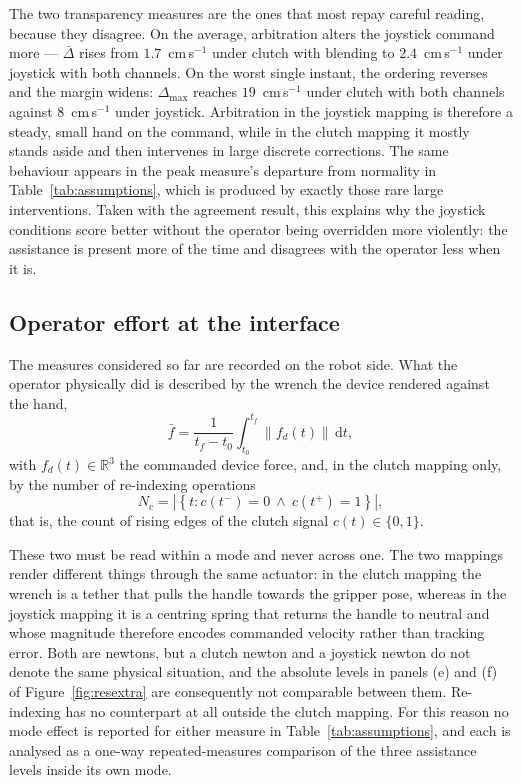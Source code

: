 \documentclass[12pt,a4paper,twoside,openright]{report}
\begin{document}
The two transparency measures are the ones that most repay careful reading, because they disagree. On the average, arbitration alters the joystick command more --- $\bar{\Delta}$ rises from $1.7$~cm\,s$^{-1}$ under clutch with blending to $2.4$~cm\,s$^{-1}$ under joystick with both channels. On the worst single instant, the ordering reverses and the margin widens: $\Delta_{\max}$ reaches $19$~cm\,s$^{-1}$ under clutch with both channels against $8$~cm\,s$^{-1}$ under joystick. Arbitration in the joystick mapping is therefore a steady, small hand on the command, while in the clutch mapping it mostly stands aside and then intervenes in large discrete corrections. The same behaviour appears in the peak measure's departure from normality in Table~\ref{tab:assumptions}, which is produced by exactly those rare large interventions. Taken with the agreement result, this explains why the joystick conditions score better without the operator being overridden more violently: the assistance is present more of the time and disagrees with the operator less when it is.



\subsection{Operator effort at the interface}
\label{sec:reseffort}

The measures considered so far are recorded on the robot side. What the operator physically did is described by the wrench the device rendered against the hand,
\begin{equation}
\bar{f} = \frac{1}{t_f-t_0} \int_{t_0}^{t_f} \lVert f_d(t) \rVert \, \mathrm{d}t,
\label{eq:mf}
\end{equation}
with $f_d(t) \in \mathbb{R}^3$ the commanded device force, and, in the clutch mapping only, by the number of re-indexing operations
\begin{equation}
N_c = \left| \left\{ t : c(t^-) = 0 \ \wedge \ c(t^+) = 1 \right\} \right|,
\label{eq:mNc}
\end{equation}
that is, the count of rising edges of the clutch signal $c(t) \in \{0,1\}$.

These two must be read within a mode and never across one. The two mappings render different things through the same actuator: in the clutch mapping the wrench is a tether that pulls the handle towards the gripper pose, whereas in the joystick mapping it is a centring spring that returns the handle to neutral and whose magnitude therefore encodes commanded velocity rather than tracking error. Both are newtons, but a clutch newton and a joystick newton do not denote the same physical situation, and the absolute levels in panels (e) and (f) of Figure~\ref{fig:resextra} are consequently not comparable between them. Re-indexing has no counterpart at all outside the clutch mapping. For this reason no mode effect is reported for either measure in Table~\ref{tab:assumptions}, and each is analysed as a one-way repeated-measures comparison of the three assistance levels inside its own mode.
\end{document}
